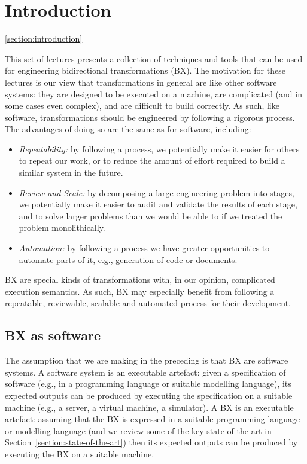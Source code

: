 \section{Introduction}
\ref{section:introduction}

This set of lectures presents a collection of techniques and tools that can be used for engineering bidirectional transformations (BX). The motivation for these lectures is our view that transformations in general are like other software systems: they are designed to be executed on a machine, are complicated (and in some cases even complex), and are difficult to build correctly. As such, like software, transformations should be engineered by following a rigorous process. The advantages of doing so are the same as for software, including:
\begin{itemize}
\item \textit{Repeatability:} by following a process, we potentially make it easier for others to repeat our work, or to reduce the amount of effort required to build a similar system in the future.
\item \textit{Review and Scale:} by decomposing a large engineering problem into stages, we potentially make it easier to audit and validate the results of each stage, and to solve larger problems than we would be able to if we treated the problem monolithically.
\item \textit{Automation:} by following a process we have greater opportunities to automate parts of it, e.g., generation of code or documents. 
\end{itemize}
BX are special kinds of transformations with, in our opinion, complicated execution semantics. As such, BX may especially benefit from following a repeatable, reviewable, scalable and automated process for their development.

\subsection{BX as software}
The assumption that we are making in the preceding is that BX are software systems. A software system is an executable artefact: given a specification of software (e.g., in a programming language or suitable modelling language), its expected outputs can be produced by executing the specification on a suitable machine (e.g., a server, a virtual machine, a simulator). A BX is an executable artefact: assuming that the BX is expressed in a suitable programming language or modelling language (and we review some of the key state of the art in Section~\ref{section:state-of-the-art}) then its expected outputs can be produced by executing the BX on a suitable machine. 

